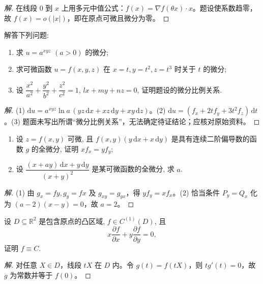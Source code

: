 \documentclass[../../数学分析培优讲义(答案版).tex]{subfiles}
\begin{document}
\begin{proof}[解]
在线段 $0$ 到 $x$ 上用多元中值公式：$f(x)=\nabla f(\theta x)\cdot x$。题设使系数趋零，故 $f(x)=o(|x|)$，即在原点可微且微分为零。
\end{proof}

\begin{example}
解答下列问题:
\begin{enumerate}[label=(\arabic*)]
    \item 求 $u=a^{xyz}$ $(a>0)$ 的微分;
    \item 求可微函数 $u=f(x,y,z)$ 在 $x=t,y=t^2,z=t^3$ 时关于 $t$ 的微分;
    \item 设 $\dfrac{x^2}{a^2}+\dfrac{y^2}{b^2}+\dfrac{z^2}{c^2}=1$, $lx+my+nz=0$, 证明题设的微分比例关系.
\end{enumerate}
\end{example}

\begin{proof}[解]
(1) $\mathrm du=a^{xyz}\ln a\,(yz\,\mathrm dx+xz\,\mathrm dy+xy\,\mathrm dz)$。(2) $\mathrm du=(f_x+2tf_y+3t^2f_z)\,\mathrm dt$。(3) 题面未写出所谓“微分比例关系”，无法确定待证结论；应核对原始资料。
\end{proof}

\begin{example}
\begin{enumerate}[label=(\arabic*)]
    \item 设 $z=f(x,y)$ 可微, 且 $f(x,y)(y\,\mathrm{d}x+x\,\mathrm{d}y)$ 是具有连续二阶偏导数的函数 $g$ 的全微分, 证明 $xf_x=yf_y$;
    \item 设 $\displaystyle\dfrac{(x+ay)\,\mathrm{d}x+y\,\mathrm{d}y}{(x+y)^2}$ 是某可微函数的全微分, 求 $a$.
\end{enumerate}
\end{example}

\begin{proof}[解]
(1) 由 $g_x=fy,g_y=fx$ 及 $g_{xy}=g_{yx}$，得 $y f_y=x f_x$。(2) 恰当条件 $P_y=Q_x$ 化为 $(a-2)(x-y)=0$，故 $a=2$。
\end{proof}

\begin{example}
设 $D\subseteq\mathbb{R}^2$ 是包含原点的凸区域, $f\in C^{(1)}(D)$, 且
\[
    x\dfrac{\partial f}{\partial x}+y\dfrac{\partial f}{\partial y}=0,
\]
证明 $f\equiv C$.
\end{example}

\begin{proof}[解]
对任意 $X\in D$，线段 $tX$ 在 $D$ 内。令 $g(t)=f(tX)$，则 $tg'(t)=0$，故 $g$ 为常数并等于 $f(0)$。
\end{proof}
\end{document}
